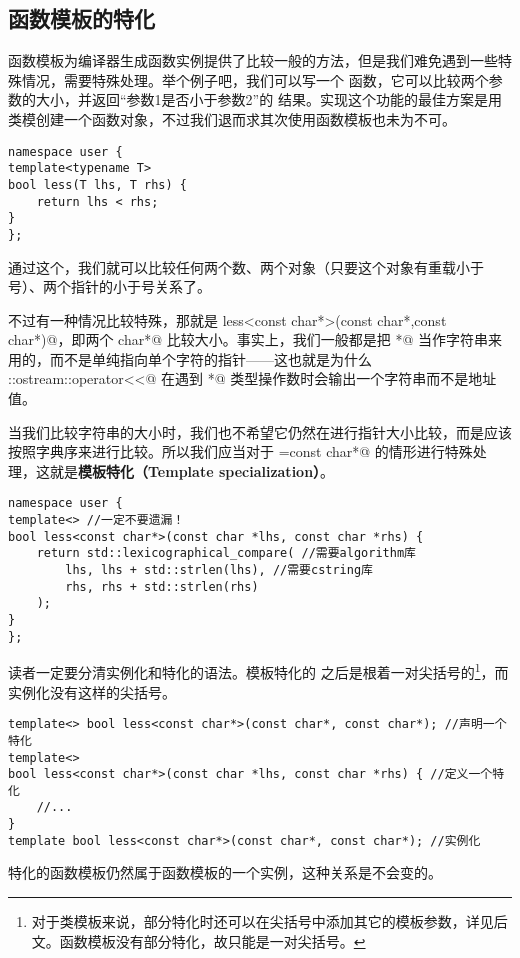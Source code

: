 \subsection*{函数模板的特化}
函数模板为编译器生成函数实例提供了比较一般的方法，但是我们难免遇到一些特殊情况，需要特殊处理。举个例子吧，我们可以写一个 \lstinline@less@ 函数，它可以比较两个参数的大小，并返回``参数1是否小于参数2''的 \lstinline@bool@ 结果。实现这个功能的最佳方案是用类模创建一个函数对象，不过我们退而求其次使用函数模板也未为不可。
\begin{lstlisting}
namespace user {
template<typename T>
bool less(T lhs, T rhs) {
    return lhs < rhs;
}
};
\end{lstlisting}
通过这个，我们就可以比较任何两个数、两个对象（只要这个对象有重载小于号）、两个指针的小于号关系了。\par
不过有一种情况比较特殊，那就是 \lstinline@bool less<const char*>(const char*,const char*)@，即两个 \lstinline@const char*@ 比较大小。事实上，我们一般都是把 \lstinline@char*@ 当作字符串来用的，而不是单纯指向单个字符的指针——这也就是为什么 \lstinline@std::ostream::operator<<@ 在遇到 \lstinline@char*@ 类型操作数时会输出一个字符串而不是地址值。\par
当我们比较字符串的大小时，我们也不希望它仍然在进行指针大小比较，而是应该按照字典序来进行比较。所以我们应当对于 \lstinline@T=const char*@ 的情形进行特殊处理，这就是\textbf{模板特化（Template specialization）}。\par
\begin{lstlisting}
namespace user {
template<> //一定不要遗漏！
bool less<const char*>(const char *lhs, const char *rhs) {
    return std::lexicographical_compare( //需要algorithm库
        lhs, lhs + std::strlen(lhs), //需要cstring库
        rhs, rhs + std::strlen(rhs)
    );
}
};
\end{lstlisting}\par
读者一定要分清实例化和特化的语法。模板特化的 \lstinline@template@ 之后是根着一对尖括号的\footnote{对于类模板来说，部分特化时还可以在尖括号中添加其它的模板参数，详见后文。函数模板没有部分特化，故只能是一对尖括号。}，而实例化没有这样的尖括号。
\begin{lstlisting}
template<> bool less<const char*>(const char*, const char*); //声明一个特化
template<>
bool less<const char*>(const char *lhs, const char *rhs) { //定义一个特化
    //...
}
template bool less<const char*>(const char*, const char*); //实例化
\end{lstlisting}\par
特化的函数模板仍然属于函数模板的一个实例，这种关系是不会变的。\par
